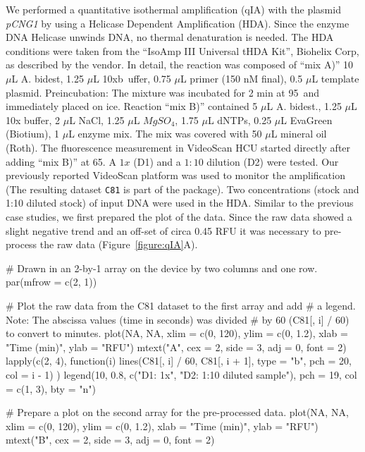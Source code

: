 We performed a quantitative isothermal amplification (qIA) with the plasmid 
\textit{pCNG1} by using a Helicase Dependent Amplification (HDA). Since the enzyme DNA 
Helicase unwinds DNA, no thermal denaturation is needed. The HDA 
conditions were taken from the ``IsoAmp III Universal tHDA Kit'', Biohelix Corp, 
as described by the vendor. In detail, the reaction was composed of ``mix A)'' 
10 $\mu$L A. bidest, 1.25 $\mu$L 10xb~uffer, 0.75 $\mu$L primer (150 nM final), 
0.5 $\mu$L template plasmid. Preincubation: The mixture was incubated for 2 min 
at 95\textcelsius~and immediately placed on ice. Reaction ``mix B)'' contained 5 
$\mu$L A. bidest., 1.25 $\mu$L 10x buffer, 2 $\mu$L NaCl, 1.25 $\mu$L 
$MgSO_{4}$, 1.75 $\mu$L dNTPs, 0.25 $\mu$L EvaGreen (Biotium), 1 $\mu$L enzyme 
mix. The mix was covered with 50 $\mu$L mineral oil (Roth). The fluorescence 
measurement in VideoScan HCU started directly after adding ``mix B)'' at 
65\textcelsius. A $1x$ (D1) and a $1:10$ dilution (D2) were tested. Our 
previously reported VideoScan platform \citep{rodiger_highly_2013} was used to 
monitor the amplification (The resulting dataset \texttt{C81} is part of the 
 package). Two concentrations (stock and 1:10 diluted stock) of 
input DNA were used in the HDA. Similar to the previous case studies, we first 
prepared the plot of the data. Since the raw 
data showed a slight negative trend and an off-set of circa 0.45 RFU 
it was necessary to pre-process the raw data (Figure~\ref{figure:qIA}A).

\begin{example}
# Drawn in an 2-by-1 array on the device by two columns and one row.
par(mfrow = c(2, 1))

# Plot the raw data from the C81 dataset to the first array and add
# a legend. Note: The abscissa values (time in seconds) was divided 
# by 60 (C81[, i] / 60) to convert to minutes.
plot(NA, NA, xlim = c(0, 120), ylim = c(0, 1.2), xlab = "Time (min)", ylab = "RFU")
mtext("A", cex = 2, side = 3, adj = 0, font = 2)
lapply(c(2, 4), function(i) {
  lines(C81[, i] / 60, C81[, i + 1], type = "b", pch = 20, col = i - 1)
})
legend(10, 0.8, c("D1: 1x", "D2: 1:10 diluted sample"), pch = 19, col = c(1, 3), 
       bty = "n")

# Prepare a plot on the second array for the pre-processed data.
plot(NA, NA, xlim = c(0, 120), ylim = c(0, 1.2), xlab = "Time (min)", ylab = "RFU")
mtext("B", cex = 2, side = 3, adj = 0, font = 2)
\end{example}

